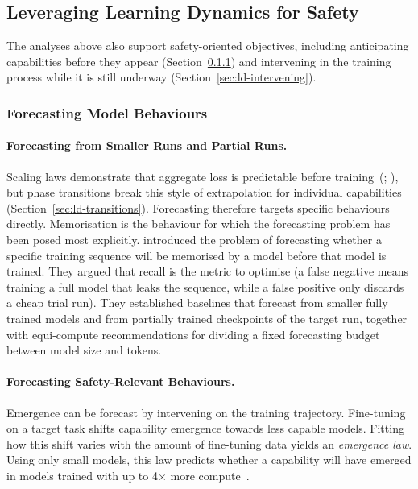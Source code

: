 \subsection{Leveraging Learning Dynamics for Safety}
\label{sec:ld-safety}
The analyses above also support safety-oriented objectives, including anticipating capabilities before they appear (Section~\ref{sec:ld-forecasting}) and intervening in the training process while it is still underway (Section~\ref{sec:ld-intervening}).

\subsubsection{Forecasting Model Behaviours}
\label{sec:ld-forecasting}

\paragraph{Forecasting from Smaller Runs and Partial Runs.} Scaling laws demonstrate that aggregate loss is predictable before training~(; ), but phase transitions break this style of extrapolation for individual capabilities (Section~\ref{sec:ld-transitions}). Forecasting therefore targets specific behaviours directly. Memorisation is the behaviour for which the forecasting problem has been posed most explicitly.  introduced the problem of forecasting whether a specific training sequence will be memorised by a model before that model is trained. They argued that recall is the metric to optimise (a false negative means training a full model that leaks the sequence, while a false positive only discards a cheap trial run). They established baselines that forecast from smaller fully trained models and from partially trained checkpoints of the target run, together with equi-compute recommendations for dividing a fixed forecasting budget between model size and tokens.

\paragraph{Forecasting Safety-Relevant Behaviours.}
Emergence can be forecast by intervening on the training trajectory. Fine-tuning on a target task shifts capability emergence towards less capable models. Fitting how this shift varies with the amount of fine-tuning data yields an \emph{emergence law}. Using only small models, this law predicts whether a capability will have emerged in models trained with up to 4$\times$ more compute~.

